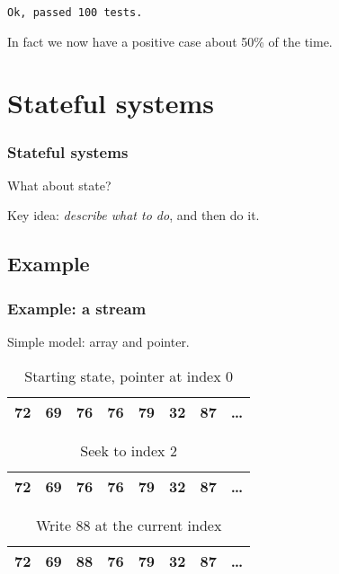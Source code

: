 \documentclass{beamer}
\begin{document}
\begin{frame}[fragile]
\begin{verbatim}
Ok, passed 100 tests.
\end{verbatim}

In fact we now have a positive case about 50\% of the time.
\end{frame}

\begin{frame}
\tableofcontents
\end{frame}

\section{Stateful systems}
\begin{frame}
\frametitle{Stateful systems}
What about state?

Key idea: \emph{describe what to do}, and then do it.
\end{frame}

\subsection{Example}
\begin{frame}[fragile]
\frametitle{Example: a stream}
Simple model: array and pointer.

\begin{table}
\captionsetup{labelformat=empty}
\caption{Starting state, pointer at index $0$}
\begin{tabular}{ |c|c|c|c|c|c|c|c }
    \hline
    \color{red}72 & 69 & 76 & 76 & 79 & 32 & 87 & \dots \\
    \hline
\end{tabular}
\end{table}

\begin{table}
\captionsetup{labelformat=empty}
\caption{Seek to index $2$}
\begin{tabular}{ |c|c|c|c|c|c|c|c }
    \hline
    72 & 69 & \color{red}76 & 76 & 79 & 32 & 87 & \dots \\
    \hline
\end{tabular}
\end{table}

\begin{table}
\captionsetup{labelformat=empty}
\caption{Write $88$ at the current index}
\begin{tabular}{ |c|c|c|c|c|c|c|c }
    \hline
    72 & 69 & \color{red}88 & 76 & 79 & 32 & 87 & \dots \\
    \hline
\end{tabular}
\end{table}

\end{frame}
\end{document}
